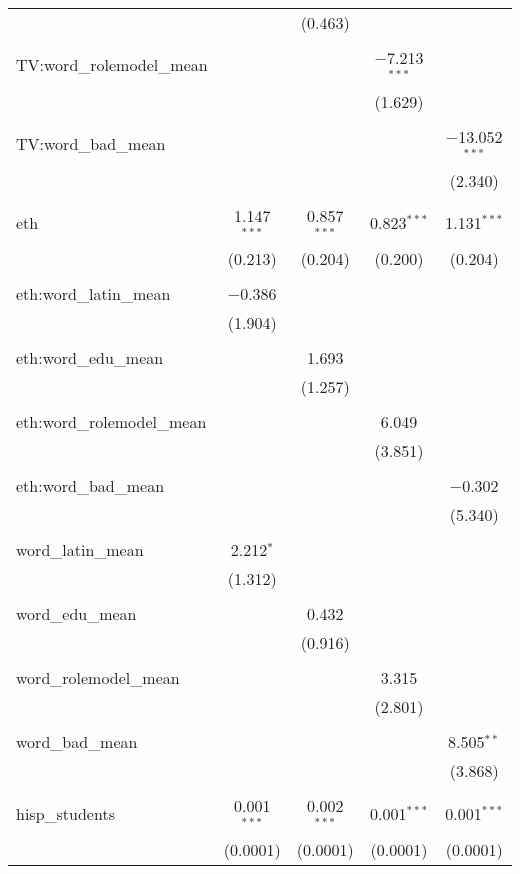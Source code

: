 \begin{table}[!htbp]
\begin{tabular}{@{\extracolsep{-2pt}}lcccc}
  &  & (0.463) &  &  \\ 
  & & & & \\ 
 TV:word\_rolemodel\_mean &  &  & $-$7.213$^{***}$ &  \\ 
  &  &  & (1.629) &  \\ 
  & & & & \\ 
 TV:word\_bad\_mean &  &  &  & $-$13.052$^{***}$ \\ 
  &  &  &  & (2.340) \\ 
  & & & & \\ 
 eth & 1.147$^{***}$ & 0.857$^{***}$ & 0.823$^{***}$ & 1.131$^{***}$ \\ 
  & (0.213) & (0.204) & (0.200) & (0.204) \\ 
  & & & & \\ 
 eth:word\_latin\_mean & $-$0.386 &  &  &  \\ 
  & (1.904) &  &  &  \\ 
  & & & & \\ 
 eth:word\_edu\_mean &  & 1.693 &  &  \\ 
  &  & (1.257) &  &  \\ 
  & & & & \\ 
 eth:word\_rolemodel\_mean &  &  & 6.049 &  \\ 
  &  &  & (3.851) &  \\ 
  & & & & \\ 
 eth:word\_bad\_mean &  &  &  & $-$0.302 \\ 
  &  &  &  & (5.340) \\ 
  & & & & \\ 
 word\_latin\_mean & 2.212$^{*}$ &  &  &  \\ 
  & (1.312) &  &  &  \\ 
  & & & & \\ 
 word\_edu\_mean &  & 0.432 &  &  \\ 
  &  & (0.916) &  &  \\ 
  & & & & \\ 
 word\_rolemodel\_mean &  &  & 3.315 &  \\ 
  &  &  & (2.801) &  \\ 
  & & & & \\ 
 word\_bad\_mean &  &  &  & 8.505$^{**}$ \\ 
  &  &  &  & (3.868) \\ 
  & & & & \\ 
 hisp\_students & 0.001$^{***}$ & 0.002$^{***}$ & 0.001$^{***}$ & 0.001$^{***}$ \\ 
  & (0.0001) & (0.0001) & (0.0001) & (0.0001) \\ 

\end{tabular}
\end{table}
